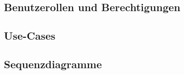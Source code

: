 \subsection{Benutzerollen und Berechtigungen}
\subsection{Use-Cases}
\subsection{Sequenzdiagramme}

